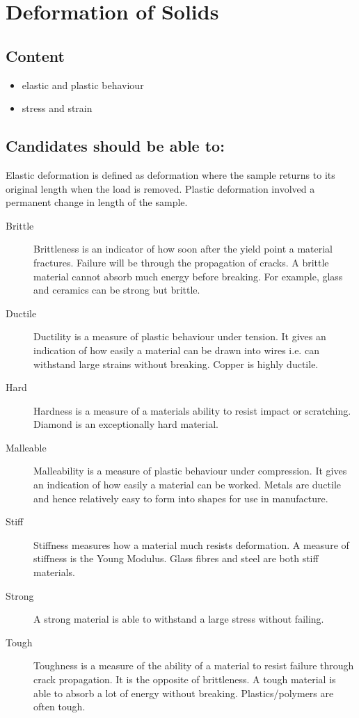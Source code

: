 \documentclass[main.tex]{subfiles}
\begin{document}
\chapter{Deformation of Solids}
\section*{Content}
\begin{itemize}
\item elastic and plastic behaviour
\item stress and strain
\end{itemize}

\section*{Candidates should be able to:}

Elastic deformation is defined as deformation where the sample returns to its original length when the load is removed. Plastic deformation involved a permanent change in length of the sample.


\begin{description}
    \item[Brittle] Brittleness is an indicator of how soon after the yield point a material fractures. Failure will be through the propagation of cracks. A brittle material cannot absorb much energy before breaking. For example, glass and ceramics can be strong but brittle.
    \item[Ductile] Ductility is a measure of plastic behaviour under tension. It gives an indication of how easily a material can be drawn into wires i.e. can withstand large strains without breaking. Copper is highly ductile.
    \item[Hard] Hardness is a measure of a materials ability to resist impact or scratching. Diamond is an exceptionally hard material.
    \item[Malleable] Malleability is a measure of plastic behaviour under compression. It gives an indication of how easily a material can be worked. Metals are ductile and hence relatively easy to form into shapes for use in manufacture.
    \item[Stiff] Stiffness measures how a material much resists deformation. A measure of stiffness is the Young Modulus. Glass fibres and steel are both stiff materials.
    \item[Strong] A strong material is able to withstand a large stress without failing.
    \item[Tough] Toughness is a measure of the ability of a material to resist failure through crack propagation. It is the opposite of brittleness. A tough material is able to absorb a lot of energy without breaking. Plastics/polymers are often tough.
\end{description}
\end{document}
